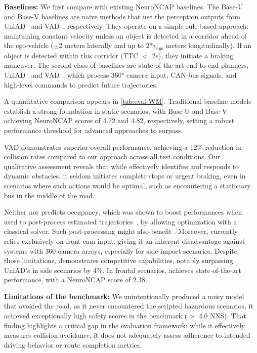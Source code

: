 \noindent \textbf{Baselines:} We first compare \vam with existing NeuroNCAP baselines. The Base-U and Base-V baselines are naïve methods that use the perception outputs from UniAD~\cite{hu2023uniad} and VAD~\cite{jiang2023vad}, respectively. They operate on a simple rule-based approach: maintaining constant velocity unless an object is detected in a corridor ahead of the ego-vehicle ($\pm$2 meters laterally and up to 2$*v_{ego}$ meters longitudinally). If an object is detected within this corridor (TTC $<$ 2s), they initiate a braking maneuver. The second class of baselines are state-of-the-art end-to-end planners, UniAD~\cite{hu2023uniad} and VAD~\cite{jiang2023vad}, which process 360° camera input, CAN-bus signals, and high-level commands to predict future trajectories.




A quantitative comparison appears in \autoref{tab:eval-WM}. Traditional baseline models establish a strong foundation in static scenarios, with Base-U and Base-V achieving NeuroNCAP scores of 4.72 and 4.82, respectively, setting a robust performance threshold for advanced approaches to surpass.

VAD demonstrates superior overall performance, achieving a 12\% reduction in collision rates compared to our approach across all test conditions. Our qualitative assessment reveals that while \vam effectively identifies and responds to dynamic obstacles, it seldom initiates complete stops or urgent braking, even in scenarios where such actions would be optimal, such as encountering a stationary bus in the middle of the road.

Neither \vm nor \vam predicts occupancy, which was shown to boost performances when used to post-process estimated trajectories~\cite{ljungbergh2024neuroncap}, by allowing optimization with a classical solver. Such post-processing might also benefit \vam. Moreover, \vam currently relies exclusively on front-cam input, giving it an inherent disadvantage against systems with 360 camera arrays, especially for side-impact scenarios. Despite those limitations, \vam demonstrates competitive capabilities, notably surpassing UniAD's in side scenarios by 4\%. In frontal scenarios, \vam achieves state-of-the-art performance, with a NeuroNCAP score of 2.38.



\noindent \textbf{Limitations of the benchmark:} We unintentionally produced a noisy model that avoided the road, as it never encountered the scripted hazardous scenarios, it achieved exceptionally high safety scores in the benchmark ($>$ 4.0 NNS). That finding highlights a critical gap in the evaluation framework: while it effectively measures collision avoidance, it does not adequately assess adherence to intended driving behavior or route completion metrics. 

